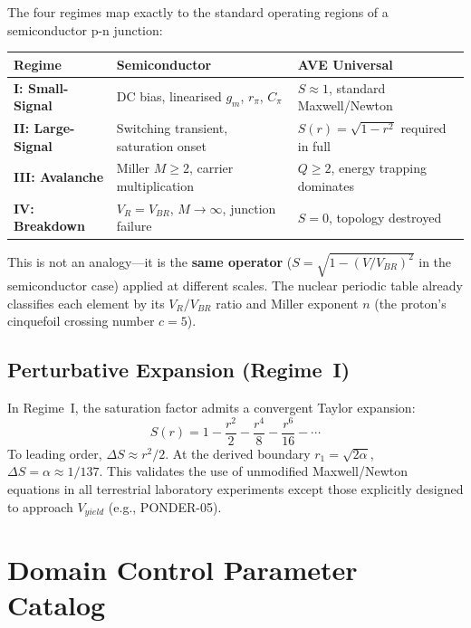 The four regimes map exactly to the standard operating regions of a semiconductor p-n junction:

\begin{center}
\renewcommand{\arraystretch}{1.3}
\begin{tabular}{l p{5cm} p{5cm}}
\toprule
\textbf{Regime} & \textbf{Semiconductor} & \textbf{AVE Universal} \\
\midrule
\textbf{I: Small-Signal} &
  DC bias, linearised $g_m$, $r_\pi$, $C_\pi$ &
  $S \approx 1$, standard Maxwell/Newton \\
\textbf{II: Large-Signal} &
  Switching transient, saturation onset &
  $S(r) = \sqrt{1-r^2}$ required in full \\
\textbf{III: Avalanche} &
  Miller $M \geq 2$, carrier multiplication &
  $Q \geq 2$, energy trapping dominates \\
\textbf{IV: Breakdown} &
  $V_R = V_{BR}$, $M \to \infty$, junction failure &
  $S = 0$, topology destroyed \\
\bottomrule
\end{tabular}
\end{center}

\noindent This is not an analogy---it is the \textbf{same operator} ($S = \sqrt{1 - (V/V_{BR})^2}$ in the semiconductor case) applied at different scales. The nuclear periodic table already classifies each element by its $V_R/V_{BR}$ ratio and Miller exponent $n$ (the proton's cinquefoil crossing number $c = 5$).

\subsection{Perturbative Expansion (Regime~I)}

In Regime~I, the saturation factor admits a convergent Taylor expansion:
\begin{equation}
    S(r) = 1 - \frac{r^2}{2} - \frac{r^4}{8} - \frac{r^6}{16} - \cdots
    \label{eq:S_taylor}
\end{equation}
To leading order, $\Delta S \approx r^2/2$. At the derived boundary $r_1 = \sqrt{2\alpha}$, $\Delta S = \alpha \approx 1/137$. This validates the use of unmodified Maxwell/Newton equations in all terrestrial laboratory experiments except those explicitly designed to approach $V_{yield}$ (e.g., PONDER-05).

\section{Domain Control Parameter Catalog}
\label{sec:domain_catalog}

